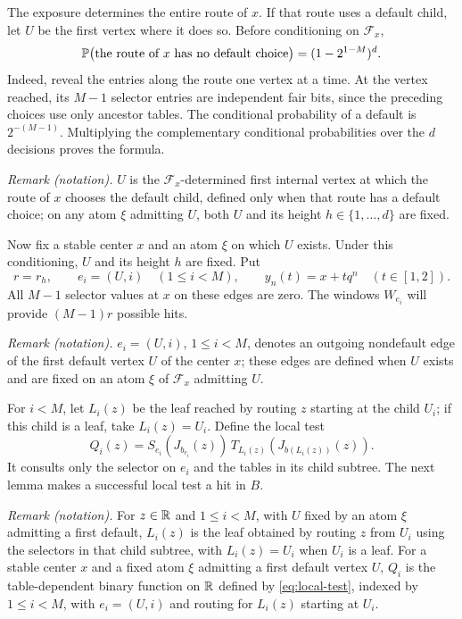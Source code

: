 The exposure determines the entire route of \(x\). If that route uses
a default child, let \(U\) be the first vertex where it does so.
Before conditioning on \(\mathcal F_x\),
\begin{equation}
 \label{eq:no-default}
 \mathbb P\bigl(\text{the route of \(x\) has no default choice}\bigr)
 =(1-2^{1-M})^d.
\end{equation}
Indeed, reveal the entries along the route one vertex at a time. At the
vertex reached, its \(M-1\) selector entries are independent fair bits,
since the preceding choices use only ancestor tables. The conditional
probability of a default is \(2^{-(M-1)}\). Multiplying the complementary
conditional probabilities over the \(d\) decisions proves the formula.

\noindent\textit{Remark (notation).} $U$ is the $\mathcal F_x$-determined first internal vertex at which the route of $x$ chooses the default child, defined only when that route has a default choice; on any atom $\xi$ admitting $U$, both $U$ and its height $h\in\{1,\ldots,d\}$ are fixed.


Now fix a stable center \(x\) and an atom \(\xi\) on which \(U\)
exists. Under this conditioning, \(U\) and its height \(h\) are fixed.
Put
\[
 r=r_h,\qquad e_i=(U,i)\quad(1\le i<M),\qquad
 y_n(t)=x+tq^n\quad(t\in[1,2]).
\]
All \(M-1\) selector values at \(x\) on these edges are zero. The
windows \(W_{e_i}\) will provide \((M-1)r\) possible hits.

\noindent\textit{Remark (notation).} $e_i=(U,i)$, $1\le i<M$, denotes an outgoing nondefault edge of the first default vertex $U$ of the center $x$; these edges are defined when $U$ exists and are fixed on an atom $\xi$ of $\mathcal F_x$ admitting $U$.


For \(i<M\), let \(L_i(z)\) be the leaf reached by routing \(z\)
starting at the child \(U_i\); if this child is a leaf, take
\(L_i(z)=U_i\). Define the local test
\begin{equation}
 \label{eq:local-test}
 Q_i(z)=S_{e_i}(J_{b_{e_i}}(z))\,
 T_{L_i(z)}(J_{b(L_i(z))}(z)).
\end{equation}
It consults only the selector on \(e_i\) and the tables in its child
subtree. The next lemma makes a successful local test a hit in \(B\).

\noindent\textit{Remark (notation).} For $z\in\mathbb R$ and $1\le i<M$, with $U$ fixed by an atom $\xi$ admitting a first default, $L_i(z)$ is the leaf obtained by routing $z$ from $U_i$ using the selectors in that child subtree, with $L_i(z)=U_i$ when $U_i$ is a leaf. For a stable center $x$ and a fixed atom $\xi$ admitting a first default vertex $U$, $Q_i$ is the table-dependent binary function on $\mathbb R$ defined by \eqref{eq:local-test}, indexed by $1\le i<M$, with $e_i=(U,i)$ and routing for $L_i(z)$ starting at $U_i$.


